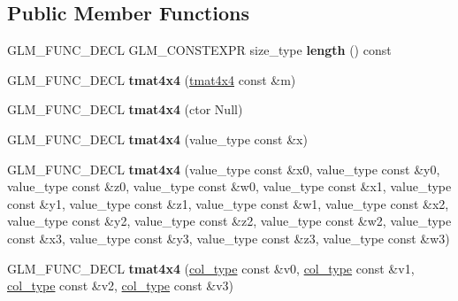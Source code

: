 \subsection*{Public Member Functions}
\begin{DoxyCompactItemize}
\item 
\hypertarget{structglm_1_1detail_1_1tmat4x4_a26c5ad5f614a69c5e33eade3d23c6dac}{}G\+L\+M\+\_\+\+F\+U\+N\+C\+\_\+\+D\+E\+C\+L G\+L\+M\+\_\+\+C\+O\+N\+S\+T\+E\+X\+P\+R size\+\_\+type {\bfseries length} () const \label{structglm_1_1detail_1_1tmat4x4_a26c5ad5f614a69c5e33eade3d23c6dac}

\item 
\hypertarget{structglm_1_1detail_1_1tmat4x4_a6d8f70d0a928383834eac416dddb1419}{}G\+L\+M\+\_\+\+F\+U\+N\+C\+\_\+\+D\+E\+C\+L {\bfseries tmat4x4} (\hyperlink{structglm_1_1detail_1_1tmat4x4}{tmat4x4} const \&m)\label{structglm_1_1detail_1_1tmat4x4_a6d8f70d0a928383834eac416dddb1419}

\item 
\hypertarget{structglm_1_1detail_1_1tmat4x4_a1e56e9d734ec4d5ea700e93a89d0cbf2}{}G\+L\+M\+\_\+\+F\+U\+N\+C\+\_\+\+D\+E\+C\+L {\bfseries tmat4x4} (ctor Null)\label{structglm_1_1detail_1_1tmat4x4_a1e56e9d734ec4d5ea700e93a89d0cbf2}

\item 
\hypertarget{structglm_1_1detail_1_1tmat4x4_aea89e4fa72c4f04eeffd9613bcc7113f}{}G\+L\+M\+\_\+\+F\+U\+N\+C\+\_\+\+D\+E\+C\+L {\bfseries tmat4x4} (value\+\_\+type const \&x)\label{structglm_1_1detail_1_1tmat4x4_aea89e4fa72c4f04eeffd9613bcc7113f}

\item 
\hypertarget{structglm_1_1detail_1_1tmat4x4_a55026312b4f9e5a8f694b3fae1ea2622}{}G\+L\+M\+\_\+\+F\+U\+N\+C\+\_\+\+D\+E\+C\+L {\bfseries tmat4x4} (value\+\_\+type const \&x0, value\+\_\+type const \&y0, value\+\_\+type const \&z0, value\+\_\+type const \&w0, value\+\_\+type const \&x1, value\+\_\+type const \&y1, value\+\_\+type const \&z1, value\+\_\+type const \&w1, value\+\_\+type const \&x2, value\+\_\+type const \&y2, value\+\_\+type const \&z2, value\+\_\+type const \&w2, value\+\_\+type const \&x3, value\+\_\+type const \&y3, value\+\_\+type const \&z3, value\+\_\+type const \&w3)\label{structglm_1_1detail_1_1tmat4x4_a55026312b4f9e5a8f694b3fae1ea2622}

\item 
\hypertarget{structglm_1_1detail_1_1tmat4x4_a1fdf6c3d8c0427e9f6e62d807ada3f94}{}G\+L\+M\+\_\+\+F\+U\+N\+C\+\_\+\+D\+E\+C\+L {\bfseries tmat4x4} (\hyperlink{structglm_1_1detail_1_1tvec4}{col\+\_\+type} const \&v0, \hyperlink{structglm_1_1detail_1_1tvec4}{col\+\_\+type} const \&v1, \hyperlink{structglm_1_1detail_1_1tvec4}{col\+\_\+type} const \&v2, \hyperlink{structglm_1_1detail_1_1tvec4}{col\+\_\+type} const \&v3)\label{structglm_1_1detail_1_1tmat4x4_a1fdf6c3d8c0427e9f6e62d807ada3f94}


\end{DoxyCompactItemize}
